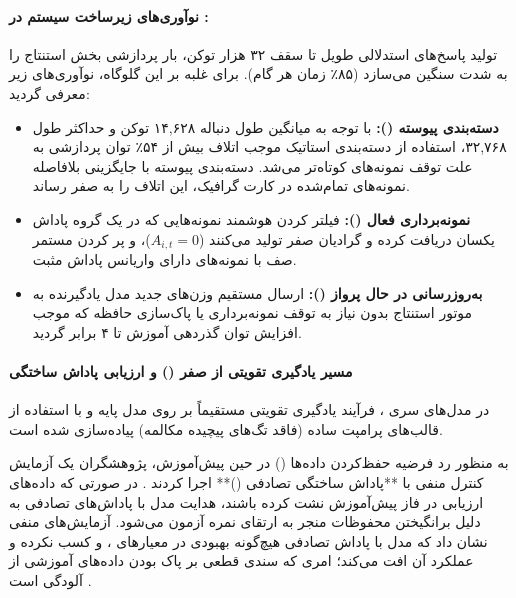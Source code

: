 \paragraph*{نوآوری‌های زیرساخت سیستم در :}
تولید پاسخ‌های استدلالی طویل تا سقف ۳۲ هزار توکن، بار پردازشی بخش استنتاج را به شدت سنگین می‌سازد (۸۵٪ زمان هر گام). برای غلبه بر این گلوگاه، نوآوری‌های زیر معرفی گردید:
\begin{itemize}
    \item \textbf{دسته‌بندی پیوسته ():} با توجه به میانگین طول دنباله ۱۴,۶۲۸ توکن و حداکثر طول ۳۲,۷۶۸، استفاده از دسته‌بندی استاتیک موجب اتلاف بیش از ۵۴٪ توان پردازشی به علت توقف نمونه‌های کوتاه‌تر می‌شد. دسته‌بندی پیوسته با جایگزینی بلافاصله نمونه‌های تمام‌شده در کارت گرافیک، این اتلاف را به صفر رساند.
    \item \textbf{نمونه‌برداری فعال ():} فیلتر کردن هوشمند نمونه‌هایی که در یک گروه پاداش یکسان دریافت کرده و گرادیان صفر تولید می‌کنند ($A_{i,t} = 0$)، و پر کردن مستمر صف با نمونه‌های دارای واریانس پاداش مثبت.
    \item \textbf{به‌روزرسانی در حال پرواز ():} ارسال مستقیم وزن‌های جدید مدل یادگیرنده به موتور استنتاج  بدون نیاز به توقف نمونه‌برداری یا پاک‌سازی حافظه  \cite{piche2025pipelinerl} که موجب افزایش توان گذردهی آموزش تا ۴ برابر گردید.
\end{itemize}

\paragraph*{مسیر یادگیری تقویتی از صفر () و ارزیابی پاداش ساختگی}
در مدل‌های سری ، فرآیند یادگیری تقویتی مستقیماً بر روی مدل پایه  و با استفاده از قالب‌های پرامپت ساده (فاقد تگ‌های پیچیده مکالمه) پیاده‌سازی شده است. 

به منظور رد فرضیه حفظ‌کردن داده‌ها () در حین پیش‌آموزش، پژوهشگران یک آزمایش کنترل منفی با **پاداش ساختگی تصادفی ()** اجرا کردند \cite{shao2025spurious}. در صورتی که داده‌های ارزیابی در فاز پیش‌آموزش نشت کرده باشند، هدایت مدل با پاداش‌های تصادفی به دلیل برانگیختن محفوظات منجر به ارتقای نمره آزمون می‌شود. آزمایش‌های منفی  نشان داد که مدل با پاداش تصادفی هیچ‌گونه بهبودی در معیارهای ،  و  کسب نکرده و عملکرد آن افت می‌کند؛ امری که سندی قطعی بر پاک بودن داده‌های آموزشی از آلودگی است \cite{olmo3}.